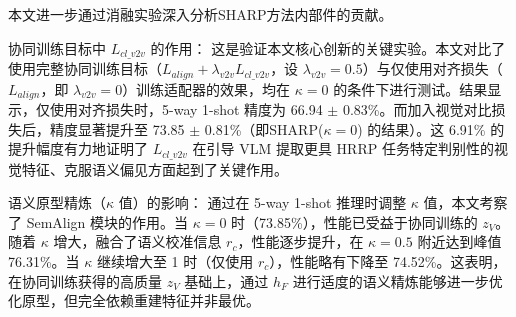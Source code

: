 \begin{table}[h!] 
\centering 
\caption{所提SHARP方法与对比方法小样本HRRP识别准确率对比} \label{tab:main_results_adapter_semantic_filled} %
\end{table} 
\captionsetup{skip=5pt} 
 
本文进一步通过消融实验深入分析SHARP方法内部件的贡献。
 
协同训练目标中 $L_{cl\_v2v}$ 的作用： 这是验证本文核心创新的关键实验。本文对比了使用完整协同训练目标（$L_{align} + \lambda_{v2v} L_{cl\_v2v}$，设 $\lambda_{v2v}=0.5$）与仅使用对齐损失（$L_{align}$，即 $\lambda_{v2v}=0$）训练适配器的效果，均在 $\kappa=0$ 的条件下进行测试。结果显示，仅使用对齐损失时，5-way 1-shot 精度为 66.94 $\pm$ 0.83\%。而加入视觉对比损失后，精度显著提升至 73.85 $\pm$ 0.81\%（即SHARP($\kappa=0$) 的结果）。这 6.91\% 的提升幅度有力地证明了 $L_{cl\_v2v}$ 在引导 VLM 提取更具 HRRP 任务特定判别性的视觉特征、克服语义偏见方面起到了关键作用。
 
语义原型精炼（$\kappa$ 值）的影响： 通过在 5-way 1-shot 推理时调整 $\kappa$ 值，本文考察了 SemAlign 模块的作用。当 $\kappa=0$ 时（73.85\%），性能已受益于协同训练的 $z_V$。随着 $\kappa$ 增大，融合了语义校准信息 $r_c$，性能逐步提升，在 $\kappa=0.5$ 附近达到峰值 76.31\%。当 $\kappa$ 继续增大至 1 时（仅使用 $r_c$），性能略有下降至 74.52\%。这表明，在协同训练获得的高质量 $z_V$ 基础上，通过 $h_F$ 进行适度的语义精炼能够进一步优化原型，但完全依赖重建特征并非最优。
 
